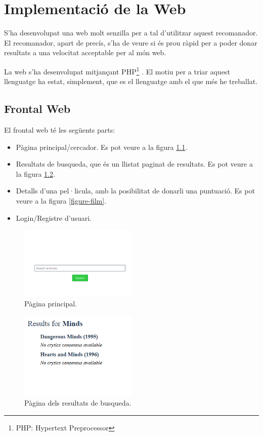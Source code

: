 \chapter{Implementació de la Web}

S'ha desenvolupat una web molt senzilla per a tal d'utilitzar aquest recomanador. El recomanador, apart de precís, s'ha de veure si és prou ràpid per a poder donar resultats a una velocitat acceptable per al món web.

La web s'ha desenvolupat mitjançant PHP\footnote{PHP: Hypertext Preprocessor} \cite{php-web}. El motiu per a triar aquest llenguatge ha estat, simplement, que es el llenguatge amb el que més he treballat.

\section{Frontal Web}

El frontal web té les següents parts:

\begin{itemize}
	\item Pàgina principal/cercador. Es pot veure a la figura \ref{figure-homepage}.
	\item Resultats de busqueda, que és un llistat paginat de resultats. Es pot veure a la figura \ref{figure-search-results}.
	\item Detalls d'una pel·licula, amb la posibilitat de donarli una puntuació. Es pot veure a la figura \ref{figure-film}.
	\item Login/Registre d'usuari.
\end{itemize}


\begin{figure}[h!]
  \caption{Pàgina principal.}
  \label{figure-homepage}
  \centering
    \includegraphics[width=0.5\textwidth]{figs/homepage.png}
\end{figure}

\begin{figure}[h!]
  \caption{Pàgina dels resultats de busqueda.}
  \label{figure-search-results}
  \centering
    \includegraphics[width=0.5\textwidth]{figs/resultats-busqueda.png}
\end{figure}

